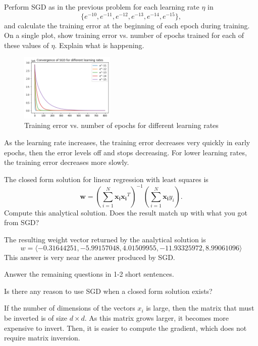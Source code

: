 \begin{problem}[2]
  Perform SGD as in the previous problem for each learning rate $\eta$ in \[\{e^{-10}, e^{-11}, e^{-12}, e^{-13}, e^{-14}, e^{-15}\},\] and calculate the training error at the beginning of each epoch during training.  On a single plot, show training error vs. number of epochs trained for each of these values of $\eta$. Explain what is happening.
\end{problem}
\begin{solution}
  \begin{figure}[H]
    \centering
    \includegraphics[width=0.4\textwidth]{images/3g.png}
    \caption{Training error vs. number of epochs for different learning rates}
    \label{fig:3g}
  \end{figure}

  As the learning rate increases, the training error decreases very quickly in early epochs, then the error levels off and stops decreasing. For lower learning rates, the training error decreases more slowly.
\end{solution}


\begin{problem}[2]
  The closed form solution for linear regression with least squares is \[\mathbf{w} = \left(\sum_{i=1}^N \mathbf{x_i}\mathbf{x_i}^T\right)^{-1}\left(\sum_{i=1}^N \mathbf{x_i}y_i\right).\]  Compute this analytical solution.  Does the result match up with what you got from SGD?
\end{problem}
\begin{solution}
  The resulting weight vector returned by the analytical solution is 
  \[
    w = \langle -0.31644251, -5.99157048, 4.01509955, -11.93325972, 8.99061096 \rangle
  \]
  This answer is very near the answer produced by SGD.
\end{solution}

Answer the remaining questions in 1-2 short sentences.

\newpage

\begin{problem}[2]
  Is there any reason to use SGD when a closed form solution exists?
\end{problem}
\begin{solution}
  If the number of dimensions of the vectors $x_i$ is large, then the matrix that must be inverted is of size $d \times d$. As this matrix grows larger, it becomes more expensive to invert. Then, it is easier to compute the gradient, which does not require matrix inversion.
\end{solution}

